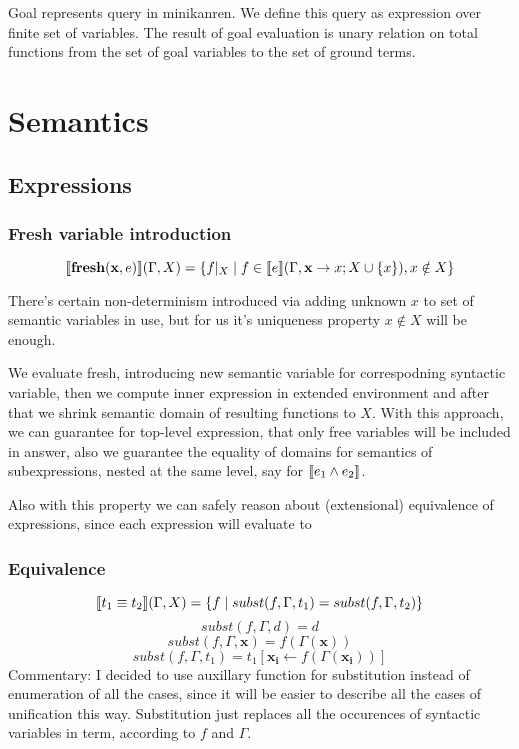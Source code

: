 \documentclass[fleqn]{article}
\begin{document}
Goal represents query in minikanren. We define this query as expression over finite set of variables. The result of goal evaluation is unary relation on total functions from the set of goal variables to the set of ground terms.

\newpage

\section{Semantics}
\subsection{Expressions}
\subsubsection{Fresh variable introduction}
\[ \llbracket\textrm{\textbf{fresh}}(\mathbf{x}, e)\rrbracket(\Gamma, X) = \{ f|_X \mid f \in \llbracket e\rrbracket(\Gamma,\mathbf{x} \rightarrow x; X \cup \{x\}), x \notin X \}\]

There's certain non-determinism introduced via adding unknown \(x\) to set of semantic variables in use, but for us it's uniqueness property \(x \notin X\) will be enough.

We evaluate fresh, introducing new semantic variable for correspodning syntactic variable, then we compute inner expression in extended environment and after that we shrink semantic domain of resulting functions to \(X\). With this approach, we can guarantee for top-level expression, that only free variables will be included in answer, also we guarantee the equality of domains for semantics of subexpressions, nested at the same level, say for \(\llbracket e_1 \wedge e_2\rrbracket\). 

Also with this property we can safely reason about (extensional) equivalence of expressions, since each expression will evaluate to 
\subsubsection{Equivalence}
\[\llbracket t_1 \equiv t_2\rrbracket(\Gamma, X) = \{ f \mid subst(f, \Gamma, t_1) = subst(f, \Gamma, t_2) \}\]
\[subst(f, \Gamma, d) = d\]
\[subst(f, \Gamma, \mathbf{x}) = f(\Gamma(\mathbf{x}))\]
\[subst(f, \Gamma, t_1) = t_1[\mathbf{x_i} \leftarrow f(\Gamma(\mathbf{x_i}))]\]
Commentary: I decided to use auxillary function for substitution instead of enumeration of all the cases, since it will be easier to describe all the cases of unification this way. Substitution just replaces all the occurences of syntactic variables in term, according to \(f\) and \(\Gamma\).
\end{document}
